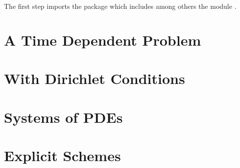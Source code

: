The first step imports the package \ESyS which includes among
others the module \finley.

\section{A Time Dependent Problem}

% 

\section{With Dirichlet Conditions}

% 

\section{Systems of PDEs}

% 

\section{Explicit Schemes}
% 
